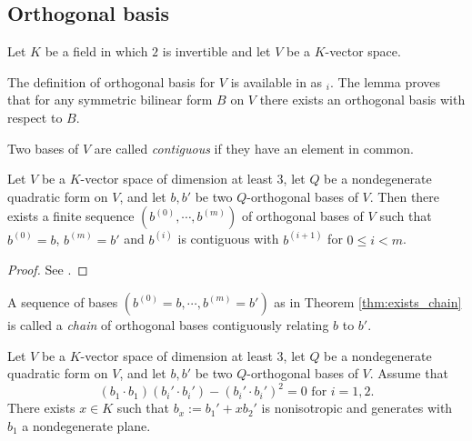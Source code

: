 \subsection{Orthogonal basis}\label{subsec:ortho_basis}

Let $K$ be a field in which $2$ is invertible and let $V$ be a $K$-vector space.

The definition of orthogonal basis for $V$ is available in \mathlib as $_i$. The lemma  proves that for any symmetric bilinear form $B$ on $V$ there exists an orthogonal basis with respect to $B$.

\begin{definition}\label{def:contiguous}
\leanok
Two bases of $V$ are called \emph{contiguous} if they have an element in common.
\end{definition}

\begin{theorem}\label{thm:exists_chain}
\leanok
Let $V$ be a $K$-vector space of dimension at least $3$, let $Q$ be a nondegenerate quadratic form on $V$, and let $b, b'$ be two $Q$-orthogonal bases of $V$. Then there exists a finite sequence $(b^{(0)}, \cdots, b^{(m)})$ of orthogonal bases of $V$ such that $b^{(0)} = b$, $b^{(m)} = b'$ and $b^{(i)}$ is contiguous with $b^{(i + 1)}$ for $0 \le i < m$.
\end{theorem}

\begin{proof}
See \cite[\S IV.1.4, Theorem 2]{Ser73}.
\end{proof}

\begin{definition}\label{def:chain}
\leanok
A sequence of bases $(b^{(0)} = b, \cdots, b^{(m)} = b')$ as in Theorem \ref{thm:exists_chain} is called a \emph{chain} of orthogonal bases contiguously relating $b$ to $b'$.
\end{definition}

\begin{lemma}\label{lem:exists_const}
\leanok
Let $V$ be a $K$-vector space of dimension at least $3$, let $Q$ be a nondegenerate quadratic form on $V$, and let $b, b'$ be two $Q$-orthogonal bases of $V$. Assume that
\[ (b_1 \cdot b_1)(b_i' \cdot b_i') - (b_i' \cdot b_i')^2 = 0 \text{ for } i = 1, 2. \]
There exists $x \in K$ such that $b_x := b_1' + x b_2'$ is nonisotropic and generates with $b_1$ a nondegenerate plane.
\end{lemma}

